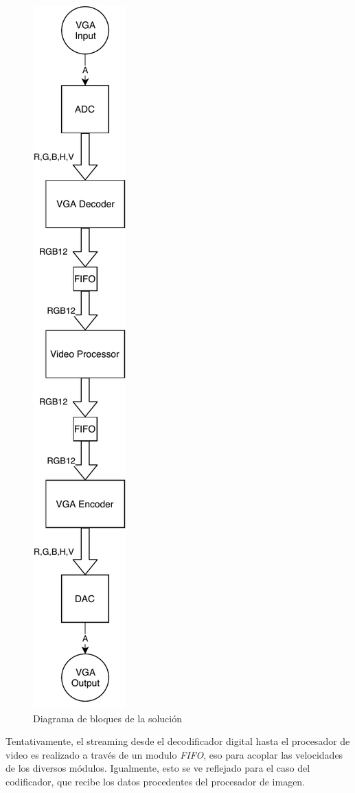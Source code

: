 \documentclass[10pt, letterpaper, conference]{IEEEtran}
\begin{document}
\begin{figure}
  \centering
  \includegraphics[width=0.25\columnwidth]{img/block_diagram.pdf}
  \caption{Diagrama de bloques de la soluci\'on}
  \label{fig:block_diagram}
\end{figure}

Tentativamente, el streaming desde el decodificador digital hasta el
procesador de video es realizado a trav\'es de un modulo \emph{FIFO},
eso para acoplar las velocidades de los diversos
m\'odulos. Igualmente, esto se ve reflejado para el caso del
codificador, que recibe los datos procedentes del procesador de
imagen.
\end{document}
